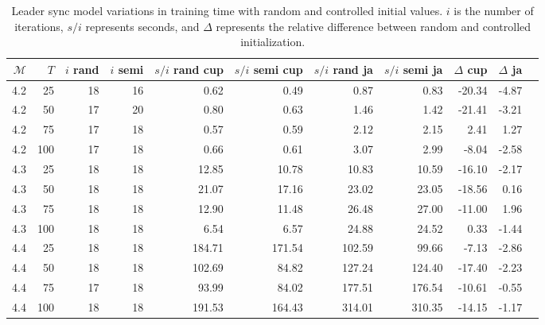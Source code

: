 \begin{table*}
    \centering
    \caption{Leader sync model variations in training time with random and controlled initial values. $i$ is the number of iterations, $s/i$ represents seconds, and $\Delta$ represents the relative difference between random and controlled initialization.}
    \label{tab:leader_results_rand_vs_semi}
    \begin{tabular}{rrrrrrrrrrr}
        \toprule
        $\mathcal{M}$ & $T$ & $i$ rand & $i$ semi & $s/i$ rand cup & $s/i$ semi cup & $s/i$ rand ja & $s/i$ semi ja & $\Delta$ cup & $\Delta$ ja \\
        \midrule
        4.2           & 25  & 18       & 16       & 0.62           & 0.49           & 0.87          & 0.83          & -20.34       & -4.87       \\
        4.2           & 50  & 17       & 20       & 0.80           & 0.63           & 1.46          & 1.42          & -21.41       & -3.21       \\
        4.2           & 75  & 17       & 18       & 0.57           & 0.59           & 2.12          & 2.15          & 2.41         & 1.27        \\
        4.2           & 100 & 17       & 18       & 0.66           & 0.61           & 3.07          & 2.99          & -8.04        & -2.58       \\
        4.3           & 25  & 18       & 18       & 12.85          & 10.78          & 10.83         & 10.59         & -16.10       & -2.17       \\
        4.3           & 50  & 18       & 18       & 21.07          & 17.16          & 23.02         & 23.05         & -18.56       & 0.16        \\
        4.3           & 75  & 18       & 18       & 12.90          & 11.48          & 26.48         & 27.00         & -11.00       & 1.96        \\
        4.3           & 100 & 18       & 18       & 6.54           & 6.57           & 24.88         & 24.52         & 0.33         & -1.44       \\
        4.4           & 25  & 18       & 18       & 184.71         & 171.54         & 102.59        & 99.66         & -7.13        & -2.86       \\
        4.4           & 50  & 18       & 18       & 102.69         & 84.82          & 127.24        & 124.40        & -17.40       & -2.23       \\
        4.4           & 75  & 17       & 18       & 93.99          & 84.02          & 177.51        & 176.54        & -10.61       & -0.55       \\
        4.4           & 100 & 18       & 18       & 191.53         & 164.43         & 314.01        & 310.35        & -14.15       & -1.17       \\
        \bottomrule
    \end{tabular}
\end{table*}


